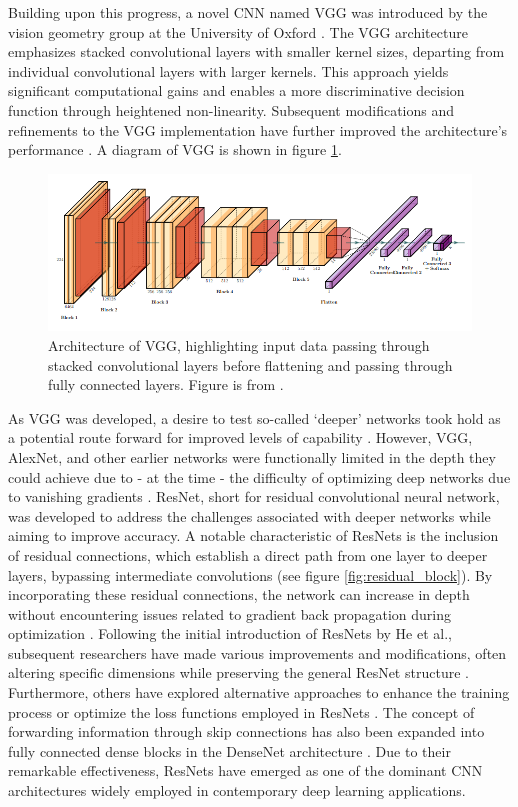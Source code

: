 Building upon this progress, a novel CNN named VGG was introduced by the vision geometry group at the University of Oxford \citep{simonyan2014very}. The VGG architecture emphasizes stacked convolutional layers with smaller kernel sizes, departing from individual convolutional layers with larger kernels. This approach yields significant computational gains and enables a more discriminative decision function through heightened non-linearity. Subsequent modifications and refinements to the VGG implementation have further improved the architecture's performance \citep{hu2018squeeze}.  A diagram of VGG is shown in figure \ref{fig:vgg_architecture}.

\begin{figure}
    \centering
    \includegraphics[width=0.5\linewidth]{Figures/vgg_architecture.png}
    \caption{Architecture of VGG, highlighting input data passing through stacked convolutional layers before flattening and passing through fully connected layers.  Figure is from \citep{vrbancic2019transfer}.}
    \label{fig:vgg_architecture}
\end{figure}

As VGG was developed, a desire to test so-called `deeper' networks took hold as a potential route forward for improved levels of capability \citep{simonyan2014very}.  However, VGG, AlexNet, and other earlier networks were functionally limited in the depth they could achieve due to - at the time - the difficulty of optimizing deep networks due to vanishing gradients \citep{he2016deep}.  ResNet, short for residual convolutional neural network, was developed to address the challenges associated with deeper networks while aiming to improve accuracy. A notable characteristic of ResNets is the inclusion of residual connections, which establish a direct path from one layer to deeper layers, bypassing intermediate convolutions (see figure \ref{fig:residual_block}). By incorporating these residual connections, the network can increase in depth without encountering issues related to gradient back propagation during optimization \citep{he2016deep}. Following the initial introduction of ResNets by He et al., subsequent researchers have made various improvements and modifications, often altering specific dimensions while preserving the general ResNet structure \citep{xie2017aggregated,zagoruyko2016wide}. Furthermore, others have explored alternative approaches to enhance the training process or optimize the loss functions employed in ResNets \citep{he2016identity,huang2016deep,he2019bag,wightman2021resnet}. The concept of forwarding information through skip connections has also been expanded into fully connected dense blocks in the DenseNet architecture \citep{huang2017densely}. Due to their remarkable effectiveness, ResNets have emerged as one of the dominant CNN architectures widely employed in contemporary deep learning applications.

